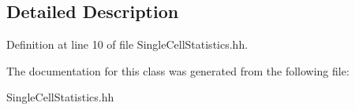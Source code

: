 \subsection{Detailed Description}


Definition at line 10 of file Single\-Cell\-Statistics.\-hh.



The documentation for this class was generated from the following file\-:\begin{DoxyCompactItemize}
\item 
Single\-Cell\-Statistics.\-hh\end{DoxyCompactItemize}
